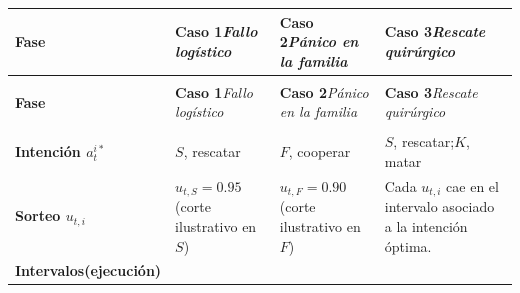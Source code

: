 \documentclass[12pt]{article}
\newcommand{\MechanismCuadroCaptionSetup}{%
  \captionsetup[table]{%
    position=top,
    font=small,
    labelfont=bf,
    textfont=it,
    labelsep=newline,
    justification=raggedright,
    singlelinecheck=false,
    skip=0.35\baselineskip,
  }%
}
\theoremstyle{definition}
\theoremstyle{remark}
\newcommand{\1}{\mathbf{1}}
\renewcommand{\tablename}{Cuadro}
\begin{document}
\begingroup
  \small
  \setlength{\LTpre}{0.35\baselineskip}
  \setlength{\LTpost}{0.35\baselineskip}
  \setlength{\tabcolsep}{5pt}
  \renewcommand{\arraystretch}{1.45}
  {\MechanismCuadroCaptionSetup
  \label{tab:ejemplos-intervalos}}
  {\renewcommand{\LTcaptype}{}%
  \begin{longtable}{@{} >{\centering\arraybackslash}m{3.05cm} *{3}{>{\raggedright\arraybackslash}p{}} @{}}
    \toprule
    \textbf{Fase} &
    \textbf{Caso 1}\newline\footnotesize\textit{Fallo logístico} &
    \textbf{Caso 2}\newline\footnotesize\textit{Pánico en la familia} &
    \textbf{Caso 3}\newline\footnotesize\textit{Rescate quirúrgico} \\
    \midrule
    \endfirsthead
    \multicolumn{4}{@{}l@{}}{
      \parbox[t]{\dimexpr\textwidth\relax}{%
        \small\raggedright
        \textbf{\tablename~\thetable{} \textup{(}continuación\textup{)}}\par\nobreak\vspace{0.3em}\nobreak
        \textit{Materialización mediante intervalos de la transformada inversa}%
      }\vspace{0.35em}
    } \\
    \toprule
    \textbf{Fase} &
    \textbf{Caso 1}\newline\footnotesize\textit{Fallo logístico} &
    \textbf{Caso 2}\newline\footnotesize\textit{Pánico en la familia} &
    \textbf{Caso 3}\newline\footnotesize\textit{Rescate quirúrgico} \\
    \midrule
    \endhead
    \midrule
    \multicolumn{4}{r}{\scriptsize\itshape continúa en la página siguiente\ldots} \\
    \endfoot
    \endlastfoot
  \textbf{Intención $a_t^{i\ast}$} &
  \underline{$S$}, rescatar &
  \underline{$F$}, cooperar &
  \underline{$S$}, rescatar;\quad \underline{$K$}, matar \\
  \midrule
  \textbf{Sorteo $u_{t,i}$} &
  $u_{t,S} = 0.95$ \textup{(}corte ilustrativo en $S$\textup{)} &
  $u_{t,F} = 0.90$ \textup{(}corte ilustrativo en $F$\textup{)} &
  Cada $u_{t,i}$ cae en el intervalo asociado a la intención óptima. \\
  \addlinespace[0.15em]
  \textbf{Intervalos}\newline\textbf{\textup{(}ejecución\textup{)}} &

\end{longtable}}
\end{document}

